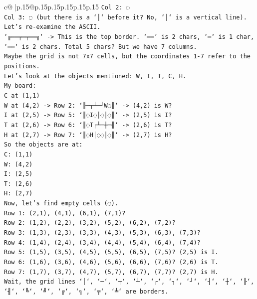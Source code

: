 \documentclass{article}
\begin{document}
{\begin{supertabular}{c@{$\;$}|p{.15\linewidth}@{}p{.15\linewidth}p{.15\linewidth}p{.15\linewidth}p{.15\linewidth}p{.15\linewidth}}
{{{\texttt{Col 2: ◌} \\
\texttt{Col 3: ◌ (but there is a `│` before it? No, `│` is a vertical line).} \\
\texttt{Let's re{-}examine the ASCII.} \\
\texttt{`╔══╤═╤══╗` {-}> This is the top border. `══` is 2 chars, `═` is 1 char, `══` is 2 chars. Total 5 chars? But we have 7 columns.} \\
\texttt{Maybe the grid is not 7x7 cells, but the coordinates 1{-}7 refer to the positions.} \\
\texttt{Let's look at the objects mentioned: W, I, T, C, H.} \\
\texttt{My board:} \\
\texttt{C at (1,1)} \\
\texttt{W at (4,2) {-}> Row 2: `╟─┬┴─┘W◌║` {-}> (4,2) is W?} \\
\texttt{I at (2,5) {-}> Row 5: `║◌I◌│◌│◌║` {-}> (2,5) is I?} \\
\texttt{T at (2,6) {-}> Row 6: `║◌T┌┴─┼─╢` {-}> (2,6) is T?} \\
\texttt{H at (2,7) {-}> Row 7: `║◌H│◌◌│◌║` {-}> (2,7) is H?} \\
\texttt{So the objects are at:} \\
\texttt{C: (1,1)} \\
\texttt{W: (4,2)} \\
\texttt{I: (2,5)} \\
\texttt{T: (2,6)} \\
\texttt{H: (2,7)} \\
\texttt{Now, let's find empty cells (◌).} \\
\texttt{Row 1: (2,1), (4,1), (6,1), (7,1)?} \\
\texttt{Row 2: (1,2), (2,2), (3,2), (5,2), (6,2), (7,2)?} \\
\texttt{Row 3: (1,3), (2,3), (3,3), (4,3), (5,3), (6,3), (7,3)?} \\
\texttt{Row 4: (1,4), (2,4), (3,4), (4,4), (5,4), (6,4), (7,4)?} \\
\texttt{Row 5: (1,5), (3,5), (4,5), (5,5), (6,5), (7,5)? (2,5) is I.} \\
\texttt{Row 6: (1,6), (3,6), (4,6), (5,6), (6,6), (7,6)? (2,6) is T.} \\
\texttt{Row 7: (1,7), (3,7), (4,7), (5,7), (6,7), (7,7)? (2,7) is H.} \\
\texttt{Wait, the grid lines `│`, `─`, `┬`, `┴`, `┌`, `┐`, `┘`, `┤`, `┼`, `╟`, `╢`, `╚`, `╝`, `╔`, `╗`, `╤`, `╧` are borders.} \\
}}}
\end{supertabular}}
\end{document}
